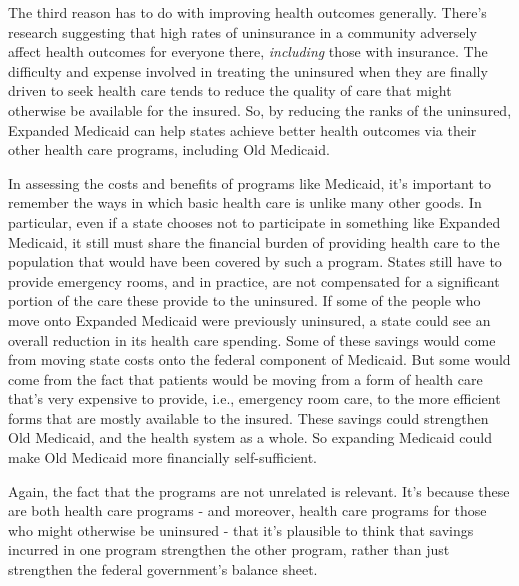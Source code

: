 \documentclass[
  11pt,
  letterpaper,
  DIV=11,
  numbers=noendperiod,
  oneside]{scrartcl}
\begin{document}
The third reason has to do with improving health outcomes generally.
There's research suggesting that high rates of uninsurance in a
community adversely affect health outcomes for everyone there,
\emph{including} those with insurance. The difficulty and expense involved in treating the uninsured when
they are finally driven to seek health care tends to reduce the quality
of care that might otherwise be available for the insured. So, by
reducing the ranks of the uninsured, Expanded Medicaid can help states
achieve better health outcomes via their other health care programs,
including Old Medicaid.

In assessing the costs and benefits of programs like Medicaid, it's
important to remember the ways in which basic health care is unlike many
other goods. In particular, even if a state chooses not to participate
in something like Expanded Medicaid, it still must share the financial
burden of providing health care to the population that would have been
covered by such a program. States still have to provide emergency rooms,
and in practice, are not compensated for a significant portion of the
care these provide to the uninsured. If some of the people who move onto
Expanded Medicaid were previously uninsured, a state could see an
overall reduction in its health care spending. Some of these savings
would come from moving state costs onto the federal component of
Medicaid. But some would come from the fact that patients would be
moving from a form of health care that's very expensive to provide,
i.e., emergency room care, to the more efficient forms that are mostly
available to the insured. These savings could
strengthen Old Medicaid, and the health system as a whole. So expanding
Medicaid could make Old Medicaid more financially self-sufficient.

Again, the fact that the programs are not unrelated is relevant. It's
because these are both health care programs - and moreover, health care
programs for those who might otherwise be uninsured - that it's
plausible to think that savings incurred in one program strengthen the
other program, rather than just strengthen the federal government's
balance sheet.
\end{document}
